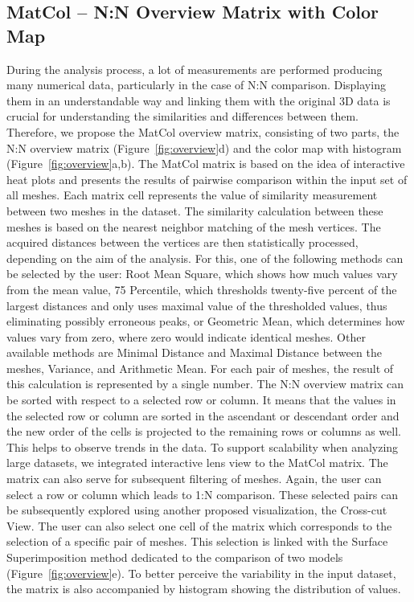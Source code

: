 \documentclass[final,5p,times]{elsarticle}
\begin{document}
\subsection{MatCol -- N:N Overview Matrix with Color Map}
During the analysis process, a lot of measurements are performed producing many numerical data, particularly in the case of N:N comparison.
Displaying them in an understandable way and linking them with the original 3D data is crucial for understanding the similarities and differences between them.
Therefore, we propose the MatCol overview matrix, consisting of two parts, the N:N overview matrix (Figure~\ref{fig:overview}d) and the color map with histogram (Figure~\ref{fig:overview}a,b). 
The MatCol matrix is based on the idea of interactive heat plots and presents the results of pairwise comparison within the input set of all meshes.
Each matrix cell represents the value of similarity measurement between two meshes in the dataset.
The similarity calculation between these meshes is based on the nearest neighbor matching of the mesh vertices.
The acquired distances between the vertices are then statistically processed, depending on the aim of the analysis.
For this, one of the following methods can be selected by the user: Root Mean Square, which shows how much values vary from the mean value, 75 Percentile, which thresholds twenty-five percent of the largest distances and only uses maximal value of the thresholded values, thus eliminating possibly erroneous peaks, or Geometric Mean, which determines how values vary from zero, where zero would indicate identical meshes. 
Other available methods are Minimal Distance and Maximal Distance between the meshes, Variance, and Arithmetic Mean.
For each pair of meshes, the result of this calculation is represented by a single number.
The N:N overview matrix can be sorted with respect to a selected row or column.
It means that the values in the selected row or column are sorted in the ascendant or descendant order and the new order of the cells is projected to the remaining rows or columns as well.
This helps to observe trends in the data.
To support scalability when analyzing large datasets, we integrated interactive lens view to the MatCol matrix.
The matrix can also serve for subsequent filtering of meshes.
Again, the user can select a row or column which leads to 1:N comparison.
These selected pairs can be subsequently explored using another proposed visualization, the Cross-cut View.
The user can also select one cell of the matrix which corresponds to the selection of a specific pair of meshes.
This selection is linked with the Surface Superimposition method dedicated to the comparison of two models (Figure~\ref{fig:overview}e).
To better perceive the variability in the input dataset, the matrix is also accompanied by histogram showing the distribution of values.
\end{document}
